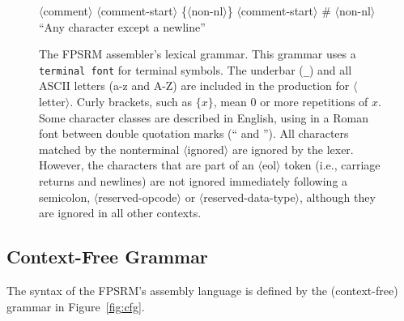 \documentclass[11pt,letterpaper]{article}
\newcommand{\figref}[1]{Figure~\ref{#1}}  %
\renewcommand{\nonterm}[1]{\mbox{$\langle$\textrm{#1}$\rangle$}}
\renewcommand{\arbno}[1]{\{#1\}}
\begin{document}
\begin{figure}
\begin{grammar}
\nonterm{comment} \: \nonterm{comment-start} \arbno{\nonterm{non-nl}}
\nonterm{comment-start} \: \#
\nonterm{non-nl} \: \textrm{``Any character except a newline''}
\end{grammar}
\caption{
  The FPSRM assembler's lexical grammar.
  This grammar uses a \texttt{terminal font}
  for terminal symbols. The underbar (\texttt{\_}) and
  all ASCII letters (a-z and A-Z) are included in the production
  for \nonterm{letter}.
  Curly brackets, such as $\arbno{x}$, mean 0 or more repetitions of $x$.
  Some character classes are described in English, using
  in a Roman font between double quotation marks (`` and '').
  All characters matched by the nonterminal
  \nonterm{ignored} are ignored by the lexer.
  However, the characters that are part of an \nonterm{eol} token
  (i.e., carriage returns and newlines) are
  not ignored immediately following a semicolon,
  \nonterm{reserved-opcode} or \nonterm{reserved-data-type}, although
  they are ignored in all other contexts.
  }
\label{fig:lexical-grammar}
\end{figure}

\subsection{Context-Free Grammar}

The syntax of the FPSRM's assembly language is defined by the
(context-free) grammar in \figref{fig:cfg}.
\end{document}
